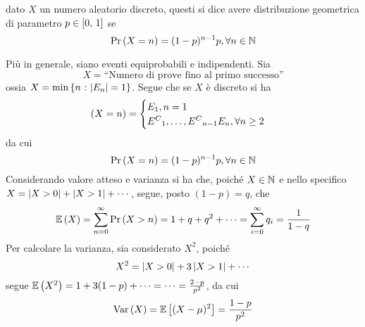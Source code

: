 \documentclass{subfiles}
\begin{document}
\begin{Definition*}
    dato \(X\) un numero aleatorio discreto, questi si dice avere distribuzione geometrica di parametro \(p \in \Range*{0}{1}\) se
    \[
        \Prob{X = n} = (1 - p)^{n - 1} p, \forall n \in \Natural
    \]
\end{Definition*}
Più in generale, siano  eventi equiprobabili e indipendenti. Sia
\[
    X = \text{``Numero di prove fino al primo successo''}
\]
ossia \(X = \Min{n}[\Abs{E_{n}} = 1]\). Segue che se \(X\) è discreto si ha
\[
    (X = n) = \begin{cases}
        E_{1}, n = 1 \\
        \List{{E^{C}}}{1}{n - 1}E_{n}, \forall n \ge 2
    \end{cases}
\]
da cui
\[
    \Prob{X = n} =(1 - p)^{n - 1}p, \forall n \in \Natural
\]
Considerando valore atteso e varianza si ha che, poiché \(X \in \operatorname{\mathbb{N}}\) e nello specifico \(X = \left\vert {X > 0} \right\vert + \left\vert {X > 1} \right\vert + \cdots\),
segue, posto \((1 - p) = q\), che
\[
    \Expected{X} = \Sum{\Prob{X > n}}{n = 0}[\infty]  = 1 + q + q^{2} + \cdots = \Sum{q_{i}}{i = 0}[\infty] = \Frac{1}{1 - q}
\]
Per calcolare la varianza, sia considerato \(X^{2}\), poiché
\[
    X^{2} = \left\vert {X > 0} \right\vert + 3 \left\vert {X > 1} \right\vert + \cdots
\]
segue \(\Expected{X^{2}} = 1 + 3(1 - p) + \cdots = \cdots = \tfrac{2 - p}{p^{2}}\), da cui
\[
    \Var{X} = \Expected*{(X - \mu)^{2}} = \Frac{1 - p}{p^{2}}
\]
\end{document}
